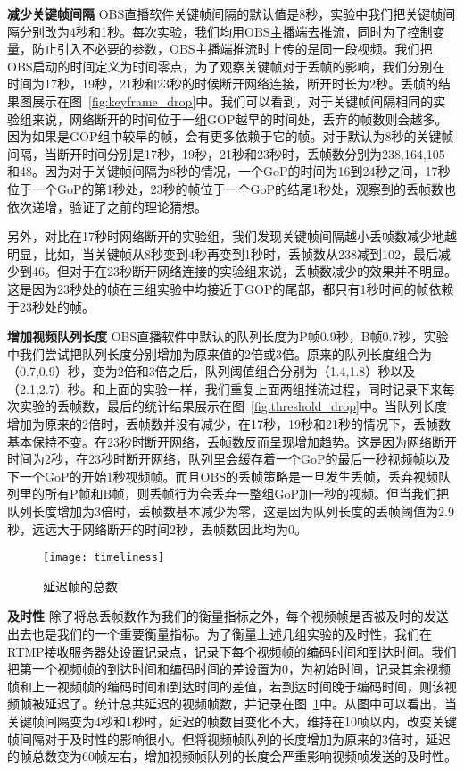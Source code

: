 \textbf{减少关键帧间隔} OBS直播软件关键帧间隔的默认值是8秒，实验中我们把关键帧间隔分别改为4秒和1秒。每次实验，我们均用OBS主播端去推流，同时为了控制变量，防止引入不必要的参数，OBS主播端推流时上传的是同一段视频。我们把OBS启动的时间定义为时间零点，为了观察关键帧对于丢帧的影响，我们分别在时间为17秒，19秒，21秒和23秒的时候断开网络连接，断开时长为2秒。丢帧的结果图展示在图~\ref{fig:keyframe_drop}中。我们可以看到，对于关键帧间隔相同的实验组来说，网络断开的时间位于一组GOP越早的时间处，丢弃的帧数则会越多。因为如果是GOP组中较早的帧，会有更多依赖于它的帧。对于默认为8秒的关键帧间隔，当断开时间分别是17秒，19秒，21秒和23秒时，丢帧数分别为238,164,105和48。因为对于关键帧间隔为8秒的情况，一个GoP的时间为16到24秒之间，17秒位于一个GoP的第1秒处，23秒的帧位于一个GoP的结尾1秒处，观察到的丢帧数也依次递增，验证了之前的理论猜想。

另外，对比在17秒时网络断开的实验组，我们发现关键帧间隔越小丢帧数减少地越明显，比如，当关键帧从8秒变到4秒再变到1秒时，丢帧数从238减到102，最后减少到46。但对于在23秒断开网络连接的实验组来说，丢帧数减少的效果并不明显。这是因为23秒处的帧在三组实验中均接近于GOP的尾部，都只有1秒时间的帧依赖于23秒处的帧。

\textbf{增加视频队列长度} OBS直播软件中默认的队列长度为P帧0.9秒，B帧0.7秒，实验中我们尝试把队列长度分别增加为原来值的2倍或3倍。原来的队列长度组合为（0.7,0.9）秒，变为2倍和3倍之后，队列阈值组合分别为（1.4,1.8）秒以及（2.1,2.7）秒。和上面的实验一样，我们重复上面两组推流过程，同时记录下来每次实验的丢帧数，最后的统计结果展示在图~\ref{fig:threshold_drop}中。当队列长度增加为原来的2倍时，丢帧数并没有减少，在17秒，19秒和21秒的情况下，丢帧数基本保持不变。在23秒时断开网络，丢帧数反而呈现增加趋势。这是因为网络断开时间为2秒，在23秒时断开网络，队列里会缓存着一个GoP的最后一秒视频帧以及下一个GoP的开始1秒视频帧。而且OBS的丢帧策略是一旦发生丢帧，丢弃视频队列里的所有P帧和B帧，则丢帧行为会丢弃一整组GoP加一秒的视频。但当我们把队列长度增加为3倍时，丢帧数基本减少为零，这是因为队列长度的丢帧阈值为2.9秒，远远大于网络断开的时间2秒，丢帧数因此均为0。

\begin{figure}[h]%
  \centering
  \texttt{[image: timeliness]}
  \caption{延迟帧的总数}
  \label{fig:timeliness}
\end{figure}

\textbf{及时性} 除了将总丢帧数作为我们的衡量指标之外，每个视频帧是否被及时的发送出去也是我们的一个重要衡量指标。为了衡量上述几组实验的及时性，我们在RTMP接收服务器处设置记录点，记录下每个视频帧的编码时间和到达时间。我们把第一个视频帧的到达时间和编码时间的差设置为0，为初始时间，记录其余视频帧和上一视频帧的编码时间和到达时间的差值，若到达时间晚于编码时间，则该视频帧被延迟了。统计总共延迟的视频帧数，并记录在图~\ref{fig:timeliness}中。从图中可以看出，当关键帧间隔变为4秒和1秒时，延迟的帧数目变化不大，维持在10帧以内，改变关键帧间隔对于及时性的影响很小。但将视频帧队列的长度增加为原来的3倍时，延迟的帧总数变为60帧左右，增加视频帧队列的长度会严重影响视频帧发送的及时性。

